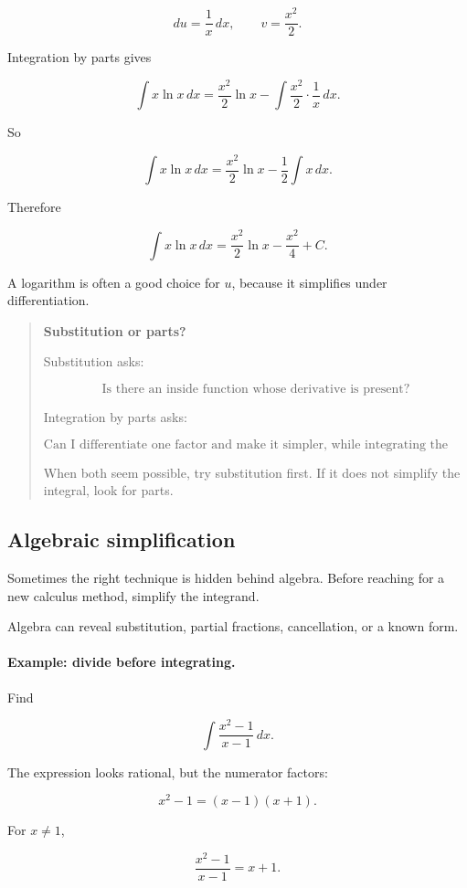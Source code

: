 \[
du=\frac1x\,dx,
\qquad
v=\frac{x^2}{2}.
\]

Integration by parts gives

\[
\int x\ln x\,dx
=
\frac{x^2}{2}\ln x-\int \frac{x^2}{2}\cdot \frac1x\,dx.
\]

So

\[
\int x\ln x\,dx
=
\frac{x^2}{2}\ln x-\frac12\int x\,dx.
\]

Therefore

\[
\boxed{
\int x\ln x\,dx
=
\frac{x^2}{2}\ln x-\frac{x^2}{4}+C.
}
\]

A logarithm is often a good choice for \(u\), because it simplifies under
differentiation.

\begin{quote}
\textbf{Substitution or parts?}

Substitution asks:

\[
\text{Is there an inside function whose derivative is present?}
\]

Integration by parts asks:

\[
\text{Can I differentiate one factor and make it simpler, while integrating the other factor?}
\]

When both seem possible, try substitution first.  If it does not simplify the integral,
look for parts.
\end{quote}

\subsection{Algebraic simplification}
\label{subsec:algebraic-simplification-before-integration}

Sometimes the right technique is hidden behind algebra.  Before reaching for a new
calculus method, simplify the integrand.

Algebra can reveal substitution, partial fractions, cancellation, or a known form.

\paragraph{Example: divide before integrating.}
Find

\[
\int \frac{x^2-1}{x-1}\,dx.
\]

The expression looks rational, but the numerator factors:

\[
x^2-1=(x-1)(x+1).
\]

For \(x\neq1\),

\[
\frac{x^2-1}{x-1}=x+1.
\]

